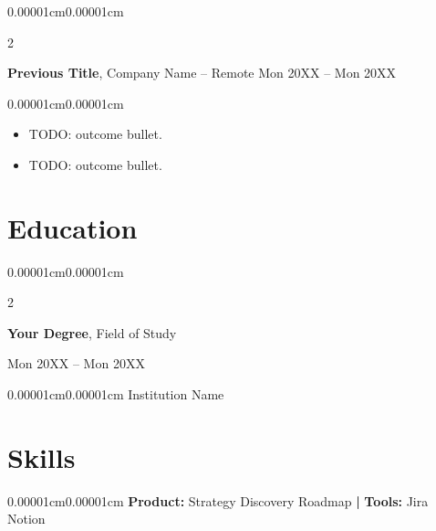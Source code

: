 \documentclass[10pt, letterpaper]{article}
\newenvironment{highlights}{
    \begin{itemize}[topsep=0.08cm, parsep=0.08cm, partopsep=0pt, itemsep=0pt, leftmargin=10pt]
}{
    \end{itemize}
}
\newenvironment{onecolentry}{\begin{adjustwidth}{0.00001cm}{0.00001cm}}{\end{adjustwidth}}
\newenvironment{twocolentry}[2][]{
    \onecolentry
    \def\secondColumn{#2}
    \setcolumnwidth{\fill, 4.5cm}
    \begin{paracol}{2}
}{
    \switchcolumn \raggedleft \secondColumn
    \end{paracol}
    \endonecolentry
}
\begin{document}
    \vspace{0.15cm}
    \begin{twocolentry}{Mon 20XX -- Mon 20XX}
        \textbf{Previous Title}, Company Name -- Remote\end{twocolentry}
    \vspace{0.08cm}
    \begin{onecolentry}
        \begin{highlights}
            \item TODO: outcome bullet.
            \item TODO: outcome bullet.
        \end{highlights}
    \end{onecolentry}

    \vspace{0.15cm}
    \section{Education}

    \begin{twocolentry}{Mon 20XX -- Mon 20XX}
        \textbf{Your Degree}, Field of Study
    \end{twocolentry}
    \vspace{0.05cm}
    \begin{onecolentry}
        Institution Name
    \end{onecolentry}

    \vspace{0.15cm}
    \section{Skills}

    \begin{onecolentry}
        \textbf{Product:} Strategy \textperiodcentered{} Discovery \textperiodcentered{} Roadmap \textbf{|} \textbf{Tools:} Jira \textperiodcentered{} Notion
    \end{onecolentry}
\end{document}
